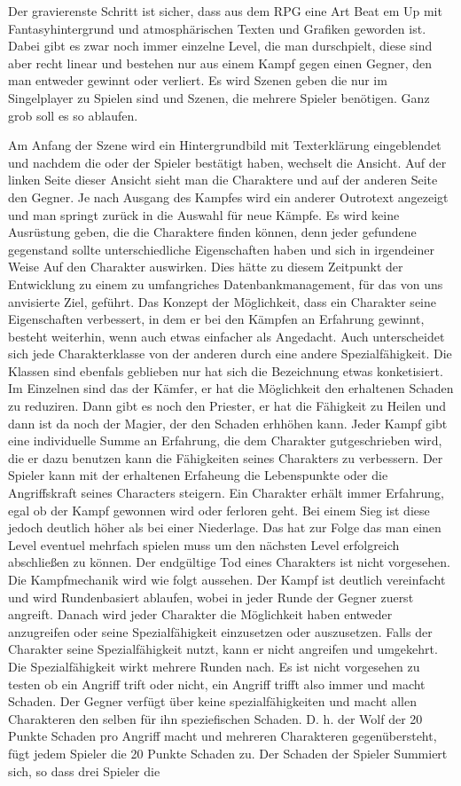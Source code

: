 Der gravierenste Schritt ist sicher, dass aus dem RPG eine Art Beat em Up mit Fantasyhintergrund und atmosphärischen Texten und Grafiken geworden ist. Dabei gibt es zwar noch immer einzelne Level, die man durschpielt, diese sind aber recht linear und bestehen nur aus einem Kampf gegen einen Gegner, den man entweder gewinnt oder verliert. Es wird Szenen geben die nur im Singelplayer zu Spielen sind und Szenen, die mehrere Spieler benötigen. Ganz grob soll es so ablaufen.

 Am Anfang der Szene wird ein Hintergrundbild mit Texterklärung eingeblendet und nachdem die oder der Spieler bestätigt haben, wechselt die Ansicht. Auf der linken Seite dieser Ansicht sieht man die Charaktere und auf der anderen Seite den Gegner. Je nach Ausgang des Kampfes wird ein anderer Outrotext angezeigt und man springt zurück in die Auswahl für neue Kämpfe. Es wird keine Ausrüstung geben, die die Charaktere finden können, denn jeder gefundene gegenstand sollte unterschiedliche Eigenschaften haben und sich in irgendeiner Weise Auf den Charakter auswirken. Dies hätte zu diesem Zeitpunkt der Entwicklung zu einem zu umfangriches Datenbankmanagement, für das von uns anvisierte Ziel, geführt. Das Konzept der Möglichkeit, dass ein Charakter seine Eigenschaften verbessert, in dem er bei den Kämpfen an Erfahrung gewinnt, besteht weiterhin, wenn auch etwas einfacher als Angedacht. Auch unterscheidet sich jede Charakterklasse von der anderen durch eine andere Spezialfähigkeit. Die Klassen sind ebenfals geblieben nur hat sich die Bezeichnung etwas konketisiert. Im Einzelnen sind das der Kämfer, er hat die Möglichkeit den erhaltenen Schaden zu reduziren. Dann gibt es noch den Priester, er hat die Fähigkeit zu Heilen und dann ist da noch der Magier, der den Schaden erhhöhen kann. Jeder Kampf gibt eine individuelle Summe an Erfahrung, die dem Charakter gutgeschrieben wird, die er dazu benutzen kann die Fähigkeiten seines Charakters zu verbessern. Der Spieler kann mit der erhaltenen Erfaheung die Lebenspunkte oder die Angriffskraft seines Characters steigern. Ein Charakter erhält immer Erfahrung, egal ob der Kampf gewonnen wird oder ferloren geht. Bei einem Sieg ist diese jedoch deutlich höher als bei einer Niederlage. Das hat zur Folge das man einen Level eventuel mehrfach spielen muss um den nächsten Level erfolgreich abschließen zu können. Der endgültige Tod eines Charakters ist nicht vorgesehen. Die Kampfmechanik wird wie folgt aussehen. Der Kampf ist deutlich vereinfacht und wird Rundenbasiert ablaufen, wobei in jeder Runde der Gegner zuerst angreift. Danach wird jeder Charakter die Möglichkeit haben entweder anzugreifen oder seine Spezialfähigkeit einzusetzen oder auszusetzen. Falls der Charakter seine Spezialfähigkeit nutzt, kann er nicht angreifen und umgekehrt. Die Spezialfähigkeit wirkt mehrere Runden nach. Es ist nicht vorgesehen zu testen ob ein Angriff trift oder nicht, ein Angriff trifft also immer und macht Schaden. Der Gegner verfügt über keine spezialfähigkeiten und macht allen Charakteren den selben für ihn speziefischen Schaden. D. h. der Wolf der 20 Punkte Schaden pro Angriff macht und mehreren Charakteren gegenübersteht, fügt jedem Spieler die 20 Punkte Schaden zu. Der Schaden der Spieler Summiert sich, so dass drei Spieler die 